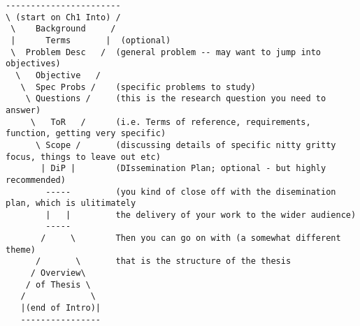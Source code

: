 \begin{lstlisting}
-----------------------
\ (start on Ch1 Into) /
 \    Background     /
 |      Terms       |  (optional)
 \  Problem Desc   /  (general problem -- may want to jump into objectives)
  \   Objective   /
   \  Spec Probs /    (specific problems to study)
    \ Questions /     (this is the research question you need to answer)
     \   ToR   /      (i.e. Terms of reference, requirements, function, getting very specific)
      \ Scope /       (discussing details of specific nitty gritty focus, things to leave out etc)
       | DiP |        (DIssemination Plan; optional - but highly recommended)
        -----         (you kind of close off with the disemination plan, which is ulitimately 
        |   |         the delivery of your work to the wider audience)
        -----
       /     \        Then you can go on with (a somewhat different theme)
      /       \       that is the structure of the thesis
     / Overview\
    / of Thesis \
   /             \
   |(end of Intro)|
   ----------------
\end{lstlisting}
